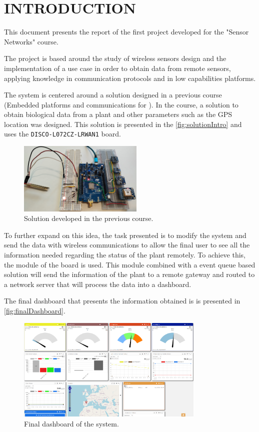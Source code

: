 \section{INTRODUCTION}

This document presents the report of the first project developed for the "Sensor Networks" course.

The project is based around the study of wireless sensors design and the implementation of a use case in order to obtain data from remote sensors, applying knowledge in communication protocols and in low capabilities platforms.

The system is centered around a solution designed in a previous course (Embedded platforms and communications for ). In the course, a solution to obtain biological data from a plant and other parameters such as the 
GPS location was designed. This solution is presented in the \autoref{fig:solutionIntro} and uses the \texttt{DISCO-L072CZ-LRWAN1} board.
\begin{figure}[H]
    \centering
    \includegraphics[width=0.53\textwidth]{images/1/sistema.png}
    \caption{Solution developed in the previous course.}
    \label{fig:solutionIntro}
\end{figure}

To further expand on this idea, the task presented is to modify the system and send the data with wireless communications to allow the final user to see all the information needed regarding the status of the plant 
remotely. To achieve this, the  module of the board is used. This module combined with a event queue based solution will send the information of the plant to 
a remote gateway and routed to a network server that will process the data into a dashboard.

The final dashboard that presents the information obtained is is presented in \autoref{fig:finalDashboard}.
\begin{figure}[H]
    \centering
    \includegraphics[width=0.8\textwidth]{images/1/FinalDashboard.png}
    \caption{Final dashboard of the system.}
    \label{fig:finalDashboard}
\end{figure}